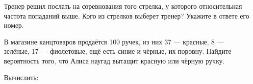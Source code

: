 \begin{class}[number=4]
\begin{listofex}
		Тренер решил послать на соревнования того стрелка, у которого относительная частота попаданий выше. Кого из стрелков выберет тренер? Укажите в ответе его номер.
		\item В магазине канцтоваров продаётся 100 ручек, из них 37 --- красные, 8 --- зелёные, 17 --- фиолетовые, ещё есть синие и чёрные, их поровну. Найдите вероятность того, что Алиса наугад вытащит красную или чёрную ручку.
		\item Вычислить:
		\begin{enumcols}[itemcolumns=3]
			\item {}
			\item {}
			\item {}
		\end{enumcols}
		\item {}
	\end{listofex}
\end{class}
%
%
